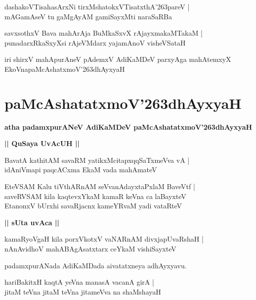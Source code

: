 \documentclass[twoside,12pt,openright]{book}
\def\S{\char'263}
\newcounter{shloka}[chapter]
\def\uvaca#1{\centerline{{\large\textbf{#1}}}}
\begin{document}
\begin{shloka}
dashakoVTisahasArxNi tirxMshatokxVTisatxthA\S pareV |\\
mAGamAseV tu gaMgAyAM gamiSayxMti naraSaRBa 
\end{shloka}

\begin{shloka}
savxsothxV Bava mahArAja BuMkaSxvX rAjayxmakaMTakaM |\\
punadarxRkaSxyXsi rAjeVMdarx yajamAnoV visheVSataH 
\end{shloka}

\begin{center}
iri shirxV mahApurAneV pAdemxV AdiKaMDeV parxyAga mahAtemxyX EkoVnapaMcAshatxmoV\S dhAyxyaH 
\end{center}

\chapter{paMcAshatatxmoV\S dhAyxyaH}

\begin{center}
{\LARGE\bfseries atha padamxpurANeV AdiKaMDeV paMcAshatatxmoV\S dhAyxyaH}
\end{center}

\uvaca{|| QuSaya UvAcUH ||}

\begin{shloka}
BavatA kathitAM savaRM yatikxMcitapxqqSaTxmeVva vA |\\
idAniVmapi paqcACxma EkaM vada mahAmateV 
\end{shloka}

\begin{shloka}
EteVSAM Kalu tiVthARnAM seVvanAdayxtaPxlaM BaveVtf |\\
saveRVSAM kila kaqtevxYkaM kamaR keVna ca laBayxteV \\
EtanonxV bUrxhi savaRjacnx kameYRvaM yadi vataRteV 
\end{shloka}

\uvaca{|| sUta uvAca ||}
 
\begin{shloka}
kamaRyoVgaH kila porxVkotxV vaNARnAM divxjapUvaRshaH |\\
nAnAvidhoV mahABAgAsatxtarx ceYkaM vishiSayxteV
\end{shloka}

\begin{center}
padamxpurANada AdiKaMDada aivatatxneya adhAyxyavu.
\end{center}

\begin{shloka}
hariBakitxH kaqtA yeVna manasA vacanA girA |\\
jitaM teVna jitaM teVna jitameVva na shaMshayaH 
\end{shloka}
\end{document}
